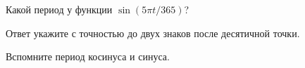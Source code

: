 
\begin{question}
Какой период у функции \(\sin(5 \pi t / 365)\)?

Ответ укажите с точностью до двух знаков после десятичной точки.
\end{question}

\begin{solution}
Вспомните период косинуса и синуса.
\end{solution}

